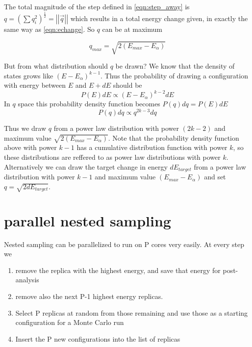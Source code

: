 \documentclass[a4paper]{article}
\begin{document}
The total magnitude of the step defined in \ref{eqn:step_away} is $q =
\left( \sum{q_i^2} \right)^{\frac{1}{2}} = \left|\left|\vec{q}\right|\right|$ which results in a total energy change given, in
exactly the same way as \ref{eqn:echange}.  So $q$ can be at maximum

\begin{equation}
  q_{max} = \sqrt{2 (E_{max} - E_{\alpha})}
\end{equation}


But from what distribution should $q$ be drawn?  
We know that the density of states grows like $(E-E_{\alpha})^{k-1}$.
Thus the probability of drawing a configuration with energy
between $E$ and $E+dE$ should be 
\begin{equation}
  P(E)dE \propto (E-E_{\alpha})^{k-2}dE
\end{equation}
In $q$ space this probability density function becomes $P(q)dq = P(E)dE$
\begin{equation}
  P(q)dq \propto q^{2k-3}dq
\end{equation}

Thus we draw $q$ from a power law distribution with power $(2k-2)$ and maximum
value $\sqrt{2 (E_{max} - E_{\alpha})}$.  Note that the probability density
function above with power $k-1$ has a cumulative distribution function with
power $k$, so these distributions are reffered to as power law distributions
with power $k$.
Alternatively we can draw the target change in energy $dE_{target}$ from a power law
distribution with power $k-1$ and maximum value $(E_{max} - E_{\alpha})$
and set $q = \sqrt{2 dE_{target}}$.


\section{parallel nested sampling}

Nested sampling can be parallelized to run on P cores very easily.
At every step we 

\begin{enumerate}
  \item remove the replica with the highest energy, and save that energy for post-analysis

  \item remove also the next P-1 highest energy replicas.

  \item Select P replicas at random from those remaining and use those as a starting
    configuration for a Monte Carlo run

  \item Insert the P new configurations into the list of replicas
\end{enumerate}
\end{document}

